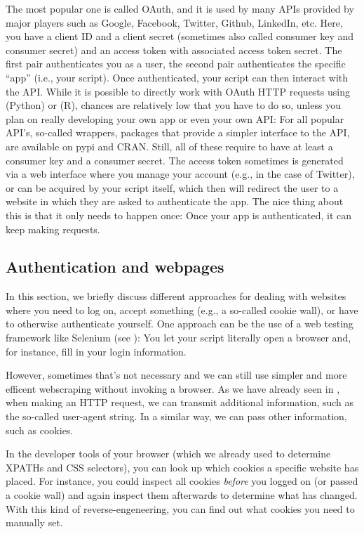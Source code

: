The most popular one is called OAuth, and it is used by many APIs
provided by major players such as Google, Facebook, Twitter, Github,
LinkedIn, etc. Here, you have a client ID and a client secret
(sometimes also called consumer key and consumer secret) and an
access token with associated access token secret. The first pair
authenticates you as a user, the second pair authenticates the
specific ``app'' (i.e., your script). Once authenticated, your
script can then interact with the API. While it is possible to
directly work with OAuth HTTP requests using 
(Python) or  (R), chances are relatively low that you
have to do so, unless you plan on really developing your own app
or even your own API: For all popular API's, so-called wrappers,
packages that provide a simpler interface to the API, are available
on pypi and CRAN. Still, all of these require to have at least
a consumer key and a consumer secret. The access token sometimes
is generated via a web interface where you manage your account
(e.g., in the case of Twitter), or can be acquired by your script
itself, which then will redirect the user to a website in which
they are asked to authenticate the app. The nice thing about this
is that it only needs to happen once: Once your app is authenticated,
it can keep making requests.




\subsection{Authentication and webpages}
\label{sec:authweb}
In this section, we briefly discuss different approaches for dealing
with websites where you need to log on, accept something (e.g., a
so-called cookie wall), or have to otherwise authenticate yourself.
One approach can be the use of a web testing framework like Selenium
(see ): You let your script literally open a browser
and, for instance, fill in your login information.

However, sometimes that's not necessary and we can still use simpler
and more efficent webscraping without invoking a browser. As we have already
seen in , when making an HTTP request, we can transmit
additional information, such as the so-called user-agent string. In a
similar way, we can pass other information, such as cookies.

In the developer tools of your browser (which we already used to determine
XPATHs and CSS selectors), you can look up which cookies a specific website
has placed. For instance, you could inspect all cookies \emph{before} you
logged on (or passed a cookie wall) and again inspect them afterwards to
determine what has changed. With this kind of reverse-engeneering, you
can find out what cookies you need to manually set.

